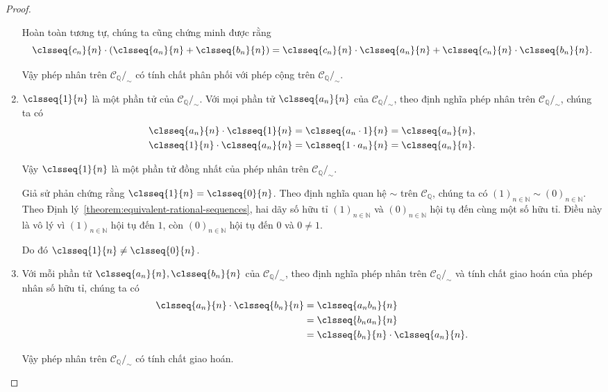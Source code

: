 \begin{proof}
\begin{enumerate}[label={(\roman*)}]
              Hoàn toàn tương tự, chúng ta cũng chứng minh được rằng
              \[
                  \clsseq{c_{n}}{n}\cdot \left(\clsseq{a_{n}}{n} + \clsseq{b_{n}}{n}\right) = \clsseq{c_{n}}{n} \cdot \clsseq{a_{n}}{n} + \clsseq{c_{n}}{n} \cdot \clsseq{b_{n}}{n}.
              \]

              Vậy phép nhân trên $\mathscr{C}_{\mathbb{Q}}/_{\sim}$ có tính chất phân phối với phép cộng trên $\mathscr{C}_{\mathbb{Q}}/_{\sim}$.
        \item $\clsseq{1}{n}$ là một phần tử của $\mathscr{C}_{\mathbb{Q}}/_{\sim}$. Với mọi phần tử $\clsseq{a_{n}}{n}$ của $\mathscr{C}_{\mathbb{Q}}/_{\sim}$, theo định nghĩa phép nhân trên $\mathscr{C}_{\mathbb{Q}}/_{\sim}$, chúng ta có
              \begin{align*}
                  \clsseq{a_{n}}{n}\cdot \clsseq{1}{n} & = \clsseq{a_{n}\cdot 1}{n} = \clsseq{a_{n}}{n}, \\
                  \clsseq{1}{n}\cdot \clsseq{a_{n}}{n} & = \clsseq{1\cdot a_{n}}{n} = \clsseq{a_{n}}{n}.
              \end{align*}

              Vậy $\clsseq{1}{n}$ là một phần tử đồng nhất của phép nhân trên $\mathscr{C}_{\mathbb{Q}}/_{\sim}$.

              Giả sử phản chứng rằng $\clsseq{1}{n} = \clsseq{0}{n}$. Theo định nghĩa quan hệ $\sim$ trên $\mathscr{C}_{\mathbb{Q}}$, chúng ta có ${(1)}_{n\in\mathbb{N}} \sim {(0)}_{n\in\mathbb{N}}$. Theo Định lý~\ref{theorem:equivalent-rational-sequences}, hai dãy số hữu tỉ ${(1)}_{n\in\mathbb{N}}$ và ${(0)}_{n\in\mathbb{N}}$ hội tụ đến cùng một số hữu tỉ. Điều này là vô lý vì ${(1)}_{n\in\mathbb{N}}$ hội tụ đến $1$, còn ${(0)}_{n\in\mathbb{N}}$ hội tụ đến $0$ và $0\ne 1$.

              Do đó $\clsseq{1}{n}\ne \clsseq{0}{n}$.
        \item Với mỗi phần tử $\clsseq{a_{n}}{n}, \clsseq{b_{n}}{n}$ của $\mathscr{C}_{\mathbb{Q}}/_{\sim}$, theo định nghĩa phép nhân trên $\mathscr{C}_{\mathbb{Q}}/_{\sim}$ và tính chất giao hoán của phép nhân số hữu tỉ, chúng ta có
              \begin{align*}
                  \clsseq{a_{n}}{n} \cdot \clsseq{b_{n}}{n} & = \clsseq{a_{n}b_{n}}{n}                     \\
                                                            & = \clsseq{b_{n}a_{n}}{n}                     \\
                                                            & = \clsseq{b_{n}}{n} \cdot \clsseq{a_{n}}{n}.
              \end{align*}

              Vậy phép nhân trên $\mathscr{C}_{\mathbb{Q}}/_{\sim}$ có tính chất giao hoán.
    \end{enumerate}
\end{proof}

